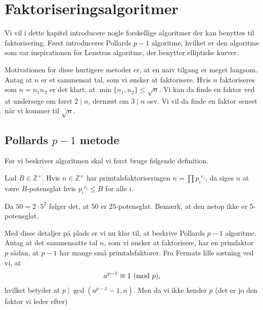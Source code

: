 \chapter{Faktoriseringsalgoritmer}
Vi vil i dette kapitel introducere nogle forskellige algoritmer
der kan benyttes til faktorisering. Først introduceres Pollards
$p-1$ algoritme, hvilket er den algoritme som var inspirationen
for Lenstras algoritme, der benytter elliptiske kurver.

Motivationen for disse hurtigere metoder er, at en naiv tilgang
er meget langsom. Antag at $n$ er et sammensat tal, som vi 
ønsker at faktorisere. Hvis $n$ faktoriseres som $n=n_1 n_2$ er 
det klart, at $\min \{n_1, n_2 \} \leq \sqrt{n}$. Vi kan da finde
en faktor ved at undersøge om først $2 \mid n$, dernæst om 
$3 \mid n$ osv. Vi vil da finde en faktor senest når vi kommer
til $\sqrt{n}$.

\section{Pollards $p-1$ metode}
Før vi beskriver algoritmen skal vi først bruge følgende 
definition.

\begin{definition}[$B$-potensglat]
Lad $B \in \mathbb{Z}^{+}$. Hvis $n \in \mathbb{Z}^{+}$ har 
primtalsfaktoriseringen $n = \prod {p_i}^{e_i}$, da siges $n$ 
at være $B$-potensglat hvis ${p_i}^{e_i} \leq B$ for alle $i$.
\end{definition}

\begin{example}
Da $50 = 2 \cdot 5^2$ følger det, at $50$ er $25$-potensglat. 
Bemærk, at den netop ikke er $5$-potensglat.
\end{example}

Med disse detaljer på plads er vi nu klar til, at beskrive Pollards
$p-1$ algoritme. Antag at det sammensatte tal $n$, som vi ønsker at
faktorisere, har en primfaktor $p$ sådan, at $p-1$ har mange små
primtalsfaktorer. Fra Fermats lille sætning ved vi, at 
\begin{align*}
	a^{p-1} \equiv 1 \ (\mathrm{mod} \ p),
\end{align*}
hvilket betyder at $p \mid \gcd(a^{p-1} - 1, n)$. Men da vi ikke kender
$p$ (det er jo den faktor vi leder efter)

